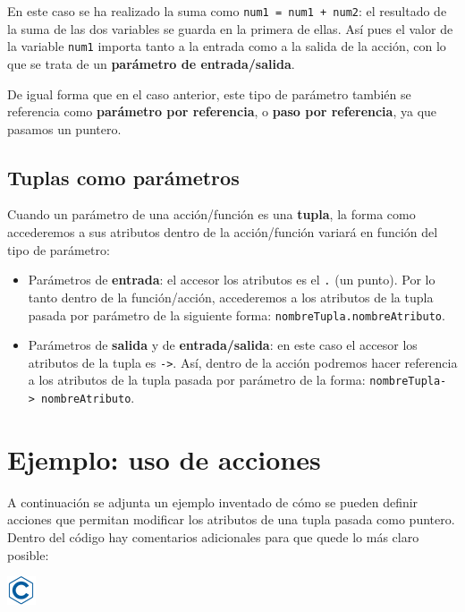 \documentclass[
]{book}
\providecommand{\tightlist}{%
  \setlength{\itemsep}{0pt}\setlength{\parskip}{0pt}}
\begin{document}
En este caso se ha realizado la suma como \texttt{num1\ =\ num1\ +\ num2}: el resultado de la suma de las dos variables se guarda en la primera de ellas. Así pues el valor de la variable \texttt{num1} importa tanto a la entrada como a la salida de la acción, con lo que se trata de un \textbf{parámetro de entrada/salida}.

De igual forma que en el caso anterior, este tipo de parámetro también se referencia como \textbf{parámetro por referencia}, o \textbf{paso por referencia}, ya que pasamos un puntero.

\hypertarget{tuplas-como-paruxe1metros}{%
\subsection{Tuplas como parámetros}\label{tuplas-como-paruxe1metros}}

Cuando un parámetro de una acción/función es una \textbf{tupla}, la forma como accederemos a sus atributos dentro de la acción/función variará en función del tipo de parámetro:

\begin{itemize}
\tightlist
\item
  Parámetros de \textbf{entrada}: el accesor los atributos es el \texttt{.} (un punto). Por lo tanto dentro de la función/acción, accederemos a los atributos de la tupla pasada por parámetro de la siguiente forma: \texttt{nombreTupla.nombreAtributo}.
\item
  Parámetros de \textbf{salida} y de \textbf{entrada/salida}: en este caso el accesor los atributos de la tupla es \texttt{-\textgreater{}}. Así, dentro de la acción podremos hacer referencia a los atributos de la tupla pasada por parámetro de la forma: \texttt{nombreTupla-\textgreater{}\ nombreAtributo}.
\end{itemize}

\hypertarget{ejemplo-uso-de-acciones}{%
\section{Ejemplo: uso de acciones}\label{ejemplo-uso-de-acciones}}

A continuación se adjunta un ejemplo inventado de cómo se pueden definir acciones que permitan modificar los atributos de una tupla pasada como puntero. Dentro del código hay comentarios adicionales para que quede lo más claro posible:

\includegraphics{./img/c.png}
\end{document}
